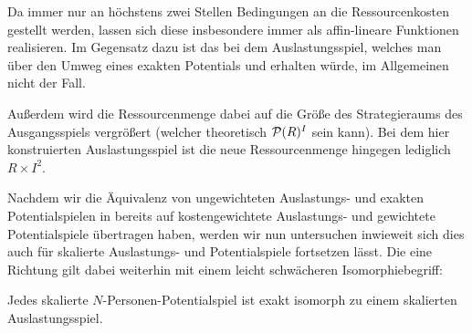 \begin{beob}
	Da immer nur an höchstens zwei Stellen Bedingungen an die Ressourcenkosten gestellt werden, lassen sich diese insbesondere immer als affin-lineare Funktionen realisieren. Im Gegensatz dazu ist das bei dem Auslastungsspiel, welches man über den Umweg eines exakten Potentials und  erhalten würde, im Allgemeinen nicht der Fall. 
	
	Außerdem wird die Ressourcenmenge dabei auf die Größe des Strategieraums des Ausgangsspiels vergrößert (welcher theoretisch $\mathcal{P}(R)^I$ sein kann). Bei dem hier konstruierten Auslastungsspiel ist die neue Ressourcenmenge hingegen lediglich $R \times I^2$.
\end{beob}

Nachdem wir die Äquivalenz von ungewichteten Auslastungs- und exakten Potentialspielen in  bereits auf kostengewichtete Auslastungs- und gewichtete Potentialspiele übertragen haben, werden wir nun untersuchen inwieweit sich dies auch für skalierte Auslastungs- und Potentialspiele fortsetzen lässt. Die eine Richtung gilt dabei weiterhin mit einem leicht schwächeren Isomorphiebegriff:

\begin{satz}\label{satz:skalPotZuSkalAusl}
	Jedes skalierte $N$-Personen-Potentialspiel ist exakt isomorph zu einem skalierten Auslastungsspiel.
\end{satz}

